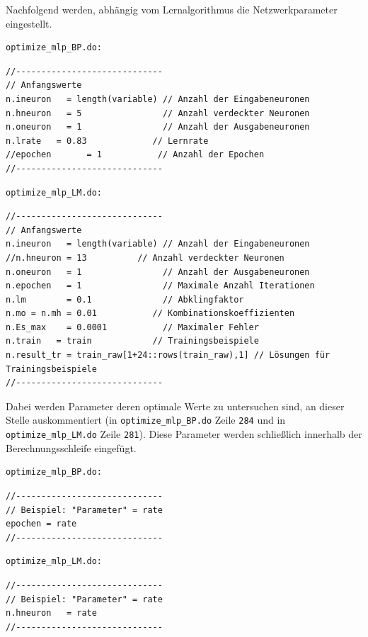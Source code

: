 Nachfolgend werden, abhängig vom Lernalgorithmus die Netzwerkparameter eingestellt.

\begin{Verbatim}
optimize_mlp_BP.do:
\end{Verbatim}
{
\begin{lstlisting}[firstnumber=278]
//-----------------------------
// Anfangswerte
n.ineuron	= length(variable) // Anzahl der Eingabeneuronen
n.hneuron	= 5                // Anzahl verdeckter Neuronen
n.oneuron	= 1                // Anzahl der Ausgabeneuronen
n.lrate   = 0.83             // Lernrate
//epochen		= 1           // Anzahl der Epochen
//-----------------------------
\end{lstlisting}
}

\begin{Verbatim}
optimize_mlp_LM.do:
\end{Verbatim}
{
\begin{lstlisting}[firstnumber=278]
//-----------------------------
// Anfangswerte
n.ineuron	= length(variable) // Anzahl der Eingabeneuronen
//n.hneuron	= 13          // Anzahl verdeckter Neuronen
n.oneuron	= 1                // Anzahl der Ausgabeneuronen
n.epochen	= 1                // Maximale Anzahl Iterationen
n.lm		= 0.1              // Abklingfaktor
n.mo = n.mh = 0.01           // Kombinationskoeffizienten
n.Es_max	= 0.0001           // Maximaler Fehler
n.train   = train            // Trainingsbeispiele
n.result_tr = train_raw[1+24::rows(train_raw),1] // Lösungen für Trainingsbeispiele
//-----------------------------
\end{lstlisting}
}

Dabei werden Parameter deren optimale Werte zu untersuchen sind, an dieser Stelle auskommentiert (in \verb|optimize_mlp_BP.do| Zeile \verb|284| und in \verb|optimize_mlp_LM.do| Zeile \verb|281|).
Diese Parameter werden schließlich innerhalb der Berechnungsschleife eingefügt.

\begin{Verbatim}
optimize_mlp_BP.do:
\end{Verbatim}
{
\begin{lstlisting}[firstnumber=300]
//-----------------------------
// Beispiel: "Parameter" = rate
epochen	= rate
//-----------------------------
\end{lstlisting}
}

\begin{Verbatim}
optimize_mlp_LM.do:
\end{Verbatim}
{
\begin{lstlisting}[firstnumber=300]
//-----------------------------
// Beispiel: "Parameter" = rate
n.hneuron	= rate
//-----------------------------
\end{lstlisting}
}

